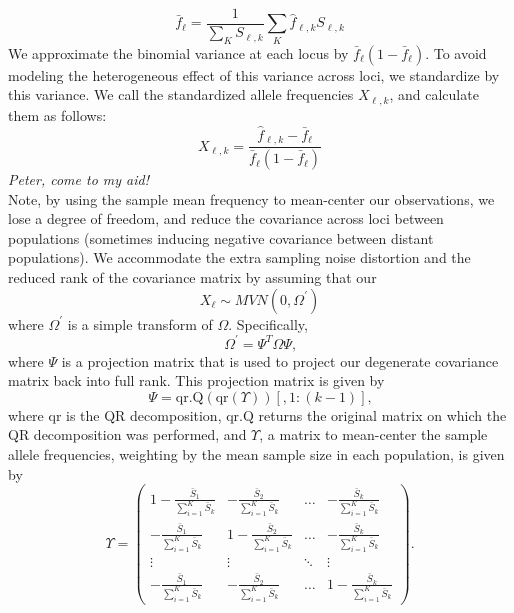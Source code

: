 \documentclass[12pt]{article}
\newcommand{\gb}[1]{{\em \color{magenta} #1}}
\begin{document}
%
\begin{equation}
\bar{f}_{\ell} = \frac{1}{\sum_K S_{\ell,k}} \sum_K \hat{f}_{\ell,k} S_{\ell,k}
\end{equation}
%
We approximate the binomial variance at each locus by $\bar{f}_{\ell}(1-\bar{f}_{\ell})$.  To avoid modeling the heterogeneous effect of this variance across loci, we standardize by this variance.  We call the standardized allele frequencies $X_{\ell,k}$, and calculate them as follows:
%
\begin{equation}
X_{\ell,k} = \frac{ \hat{f}_{\ell,k} - \bar{f}_{\ell} } {\bar{f}_{\ell}(1-\bar{f}_{\ell})}
\end{equation}
%
\gb{Peter, come to my aid!}\\
Note, by using the sample mean frequency to mean-center our observations, we lose a degree of freedom, and reduce the covariance across loci between populations (sometimes inducing negative covariance between distant populations). We accommodate the extra sampling noise distortion and the reduced rank of the covariance matrix by assuming that our
%
\begin{equation}
X_{\ell} \sim MVN(0, \Omega^{\prime} )
\end{equation}
%
where $\Omega^{\prime}$ is a simple transform of $\Omega$.  Specifically, 
%
\begin{equation}
\Omega^{\prime} = \Psi^{T}   \Omega   \Psi \text{,}
\label{eq:projected_covariance}
\end{equation}
%
where
$\Psi$ is a projection matrix that is used to project our degenerate covariance matrix back into full rank.  This projection matrix is given by
\begin{equation}
\Psi = \text{qr.Q}(\text{qr}(\Upsilon))[,1:(k-1)] \text{,}
\end{equation}
%
where $\text{qr}$ is the QR decomposition, $\text{qr.Q}$ returns the original matrix on which the QR decomposition was performed, and $\Upsilon$, a matrix to mean-center the sample allele frequencies, weighting by the mean sample size in each population, is given by 
%
\[ \Upsilon = \left( 
\begin{array}{cccc}
1 - \frac{\bar{S}_1}{\sum\limits_{i=1}^{K} \bar{S}_k	} & -\frac{\bar{S}_2}{\sum\limits_{i=1}^{K} \bar{S}_k	} & \ldots & -\frac{\bar{S}_k}{\sum\limits_{i=1}^{K} \bar{S}_k	} \\
-\frac{\bar{S}_1}{\sum\limits_{i=1}^{K} \bar{S}_k	} & 1 - \frac{\bar{S}_2}{\sum\limits_{i=1}^{K} \bar{S}_k	} & \ldots & -\frac{\bar{S}_k}{\sum\limits_{i=1}^{K} \bar{S}_k	} \\
\vdots & \vdots & \ddots  & \vdots	\\
-\frac{\bar{S}_1}{\sum\limits_{i=1}^{K} \bar{S}_k	} & -\frac{\bar{S}_2}{\sum\limits_{i=1}^{K} \bar{S}_k	} & \ldots  & 1 - \frac{\bar{S}_k}{\sum\limits_{i=1}^{K} \bar{S}_k	} 
\end{array} \right).\]\\
\end{document}
